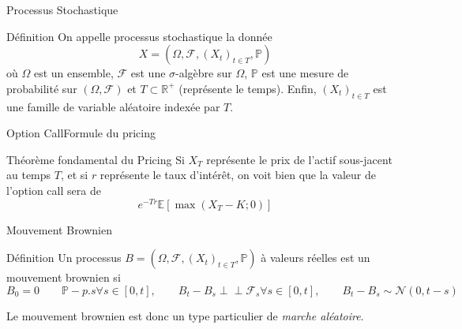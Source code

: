 \documentclass{beamer}
\newcommand{\1}{\mathmybb{1}}
\newcommand{\indep}{\perp \!\!\! \perp}
\begin{document}
\begin{frame}{Processus Stochastique}
  \begin{block}{Définition}
    On appelle processus stochastique la donnée
    \begin{equation}
      X = (\varOmega, \mathcal{F}, \left(  X_{t} \right)_{t\in T}, \mathbb{P})
    \end{equation}
    où $ \varOmega $ est un ensemble, $ \mathcal{F} $ est une $\sigma$-algèbre sur $ \varOmega $, $\mathbb{P}$ est une mesure de probabilité sur $ \left( \varOmega , \mathcal{F} \right)$ et $T \subset \mathbb{R}^{+}$ (représente le temps).
    Enfin, $\left( X_{t} \right)_{t\in T} $  est une famille de variable aléatoire indexée par $ T $.
  \end{block}
\end{frame}
\begin{frame}{Option Call}{Formule du pricing}
  \begin{block}{Théorème fondamental du Pricing}
    Si $X_T$  représente le prix de l'actif sous-jacent au temps $T$, et si $r$ représente le taux d'intérêt, on voit bien que la valeur de l'option call sera de
    \begin{equation} \label{tfp}
      e^{-Tr}\mathbb{E}\left[ \max \left(X_{T} - K; 0 \right) \right]
    \end{equation}
  \end{block}
\end{frame}
\begin{frame}{Mouvement Brownien}
  \begin{block}{Définition}
    Un processus $ B = (\varOmega, \mathcal{F}, \left(  X_{t} \right)_{t\in T}, \mathbb{P} ) $ à valeurs réelles est un mouvement brownien si
    \begin{subequations}
      \begin{equation} B_{0} = 0 \qquad \mathbb{P}-p.s \end{equation}
      \begin{equation} \forall s \in \left[0, t\right], \qquad B_{t} - B_{s} \indep \mathcal{F}_{s} \end{equation}
      \begin{equation} \forall s \in \left[0, t\right], \qquad B_{t} - B_{s} \sim \mathcal{N} \left( 0, t-s\right)\end{equation}
      \end{subequations}
    \end{block}
    Le mouvement brownien est donc un type particulier de {\em marche aléatoire}.
\end{frame}
\end{document}
